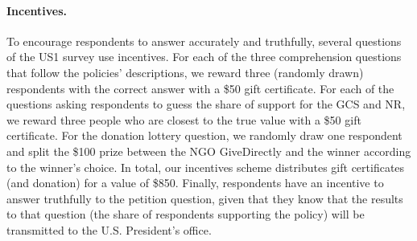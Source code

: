 \begin{small}
\paragraph{\small Incentives.} %
To encourage respondents to answer accurately and truthfully, several questions of the US1 survey use incentives. For each of the three comprehension questions that follow the policies' descriptions, we reward three (randomly drawn) respondents with the correct answer with a \$50 gift certificate. For each of the questions asking respondents to guess the share of support for the GCS and NR, we reward three people who are closest to the true value with a \$50 gift certificate. For the donation lottery question, we randomly draw one respondent and split the \$100 prize between the NGO GiveDirectly and the winner according to the winner's choice. In total, our incentives scheme distributes gift certificates (and donation) for a value of \$850. Finally, respondents have an incentive to answer truthfully to the petition question, given that they know that the results to that question (the share of respondents supporting the policy) will be transmitted to the U.S. President's office.


\end{small}  %

\renewcommand{\url}[1]{\href{#1}{Link}} %


\appendix %

